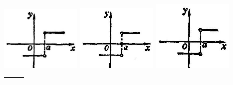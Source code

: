 \documentclass[lang=cn,newtx,10pt,scheme=chinese]{elegantbook}
\begin{document}
\begin{problemset}[练习]
\begin{center}
	\includegraphics[max width=0.3\textwidth]{images/01912c18-5c3f-733d-b775-749ba9897a9d_36_706273.jpg}
	\includegraphics[max width=0.3\textwidth]{images/01912c18-5c3f-733d-b775-749ba9897a9d_36_222184.jpg}
	\includegraphics[max width=0.3\textwidth]{images/01912c18-5c3f-733d-b775-749ba9897a9d_36_774109.jpg}
\end{center}

\noindent %
\begin{tabular}{ccc}
	\makebox[0.3\textwidth][c]{(3)} &
	\makebox[0.3\textwidth][c]{(4)} &
	\makebox[0.3\textwidth][c]{(5)}
\end{tabular}


\end{problemset}
\end{document}
